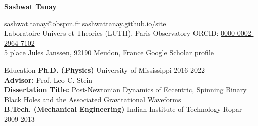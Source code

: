 \documentclass{resume} %
\begin{document}
  


  
  
\begin{center}
    {\LARGE \bf Sashwat Tanay} \\  
\end{center}



\href{mailto:sashwat.tanay@obspm.fr}{sashwat.tanay@obspm.fr} \hfill \href{https://sashwattanay.github.io/site}{sashwattanay.github.io/site} \\
Laboratoire Univers et Theories (LUTH), Paris Observatory \hfill ORCID: \href{https://orcid.org/0000-0002-2964-7102}{0000-0002-2964-7102} \\  
5 place Jules Janssen, 92190 Meudon, France \hfill Google Scholar \href{https://scholar.google.com/citations?user=EiZB2pgAAAAJ&hl=en&oi=ao}{profile}{\par}




\begin{rSection}{Education}
{\bf Ph.D. (Physics) } University of Mississippi \hfill {2016-2022}  \\
\hspace*{1cm} {\bf Advisor:} Prof. Leo C. Stein \\
\hspace*{1cm} {\bf Dissertation Title:} Post-Newtonian Dynamics of Eccentric, Spinning Binary\\
\hspace*{4.6 cm} Black Holes and the Associated Gravitational Waveforms \\
{\bf B.Tech. (Mechanical Engineering) } Indian Institute of Technology Ropar \hfill {2009-2013}  

\end{rSection}



  
\end{document}
